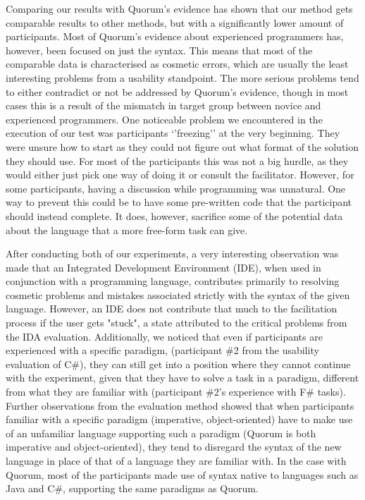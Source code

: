 \documentclass[preprint,10pt]{sigplanconf}
\begin{document}
Comparing our results with Quorum's evidence has shown that our method gets comparable results to other methods, but with a significantly lower amount of participants.
Most of Quorum's evidence about experienced programmers has, however, been focused on just the syntax.
This means that most of the comparable data is characterised as cosmetic errors, which are usually the least interesting problems from a usability standpoint.
The more serious problems tend to either contradict or not be addressed by Quorum's evidence, though in most cases this is a result of the mismatch in target group between novice and experienced programmers.
One noticeable problem we encountered in the execution of our test was participants `'freezing'' at the very beginning.
They were unsure how to start as they could not figure out what format of the solution they should use.
For most of the participants this was not a big hurdle, as they would either just pick one way of doing it or consult the facilitator.
However, for some participants, having a discussion while programming was unnatural.
One way to prevent this could be to have some pre-written code that the participant should instead complete.
It does, however, sacrifice some of the potential data about the language that a more free-form task can give.

After conducting both of our experiments, a very interesting observation was made that an Integrated Development Environment (IDE), when used in conjunction with a programming language, contributes primarily to resolving cosmetic problems and mistakes associated strictly with the syntax of the given language. However, an IDE does not contribute that much to the facilitation process if the user gets "stuck", a state attributed to the critical problems from the IDA evaluation. Additionally, we noticed that even if participants are experienced with a specific paradigm, (participant \#2 from the usability evaluation of C\#), 
they can still get into a position where they cannot continue with the experiment, given that they have to solve a task in a paradigm, different from what they are familiar with (participant \#2's experience with F\# tasks). Further observations from the evaluation method showed that when participants familiar with a specific paradigm (imperative, object-oriented) have to make use of an unfamiliar language supporting such a paradigm (Quorum is both imperative and object-oriented), they tend to disregard the syntax of the new language in place of that of a language they are familiar with. In the case with Quorum, most of the participants %
made use of syntax native to languages such as Java and C\#, supporting the same paradigms as Quorum.
\end{document}

